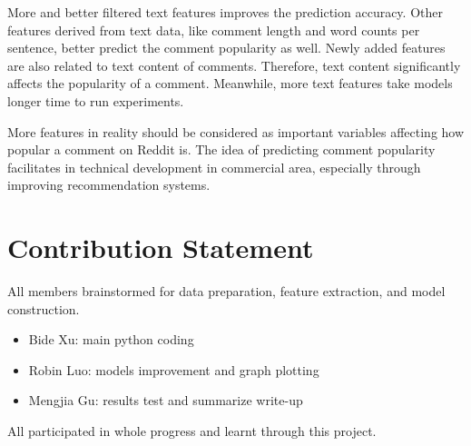 \documentclass[letterpaper, 11pt]{article}
\renewcommand{\headrulewidth}{0pt}
\renewcommand{\footrulewidth}{0pt}
\begin{document}
More and better filtered text features improves the prediction accuracy. Other features derived from text data, like comment length and word counts per sentence, better predict the comment popularity as well. Newly added features are also related to text content of comments. Therefore, text content significantly affects the popularity of a comment. Meanwhile, more text features take models longer time to run experiments.

More features in reality should be considered as important variables affecting how popular a comment on Reddit is. The idea of predicting comment popularity facilitates in technical development in commercial area, especially through improving recommendation systems.



\nocite{*}





\begingroup


    


\endgroup
\renewcommand{\thepage}{}

%

\section*{Contribution Statement}

All members brainstormed for data preparation, feature extraction, and model construction.
\begin{itemize}
    \item Bide Xu: main python coding
    \item Robin Luo: models improvement and graph plotting
    \item Mengjia Gu: results test and summarize write-up
\end{itemize}All participated in whole progress and learnt through this project.




\end{document}
